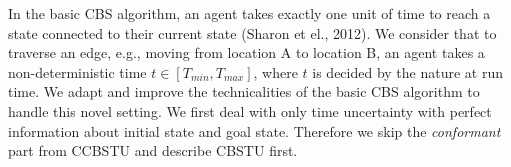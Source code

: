 \documentclass{article}
\begin{document}
{In the basic CBS algorithm, an agent takes exactly one unit of time to reach a state connected to their current state (Sharon et el., 2012). We consider that to traverse an edge, e.g., moving from location A to location B, an agent takes a non-deterministic time $t \in [T_{min}, T_{max}]$, where $t$ is decided by the nature at run time. We adapt and improve the technicalities of the basic CBS algorithm to handle this novel setting. 
We first deal with only time uncertainty with perfect information about initial state and goal state. Therefore we skip the \emph{conformant} part from CCBSTU and describe CBSTU first. 



}
\end{document}
